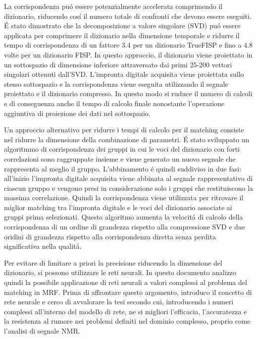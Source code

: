 \documentclass[a4paper,12pt]{report}
\begin{document}
 La corrispondenza pu\'o essere potenzialmente accelerata comprimendo il dizionario, riducendo cos\'i il numero totale di confronti che devono essere eseguiti. 
 \'E stato dimostrato \cite{mcgivney2014svd} che la decomposizione a valore singolare (SVD) pu\'o essere applicata per comprimere il dizionario nella dimensione temporale e ridurre il tempo di corrispondenza di un fattore 3.4 per un dizionario TrueFISP e fino a 4.8 volte per un dizionario FISP. 
 In questo approccio, il dizionario viene proiettato in un sottospazio di dimensione inferiore attraversato dai primi 25-200 vettori singolari ottenuti dall'SVD. 
 L'impronta digitale acquisita viene proiettata sullo stesso sottospazio e la corrispondenza viene eseguita utilizzando il segnale proiettato e il dizionario compresso. 
 In questo modo si ruduce il numero di calcoli e di conseguenza anche il tempo di calcolo finale nonostante l'operazione aggiuntiva di proiezione dei dati nel sottospazio. 
 
 Un approccio alternativo per ridurre i tempi di calcolo per il matching consiste nel ridurre la dimensione della combinazione di parametri. 
 \'E stato sviluppato un algoritmmo di corrispondenza dei gruppi in cui le voci del dizionario con forti correlazioni sono raggruppate insieme e viene generato un nuovo segnale che rappresenta al meglio il gruppo. 
 L'abbinamento \'e quindi suddiviso in due fasi: all'inizio  l'impronta digitale acquisita viene abbinata al segnale rappresentativo di ciascun gruppo e vengono presi in considerazione solo i gruppi che restituiscono la massima correlazione. 
 Quindi la corrispondenza viene utilizzata per ritrovare il miglior matching tra l'impronta digitale e le voci del dizionario associate ai gruppi prima selezionati. 
 Questo algoritmo aumenta la velocit\'a di calcolo della corrispondenza di un ordine di grandezza rispetto alla compressione SVD e due oridini di grandezza rispetto alla corrispondenza diretta senza perdita significativa nella qualit\'a. 
 
 Per evitare di limitare a priori la precisione riducendo la dimensione del dizionario, si possono utilizzare le reti neurali.
 In questo documento analizzo quindi la possibile applicazione di reti neurali a valori complessi al problema del matching in MRF.
 Prima di affrontare questo argomento, introduco il concetto di rete neurale e cerco di avvalorare la tesi secondo cui, introducendo i numeri complessi all'interno del modello di rete, ne si migliori l'efficacia, l'accuratezza e la resistenza al rumore nei problemi definiti nel dominio complesso, proprio come l'analisi di segnale NMR.
 
\end{document}
